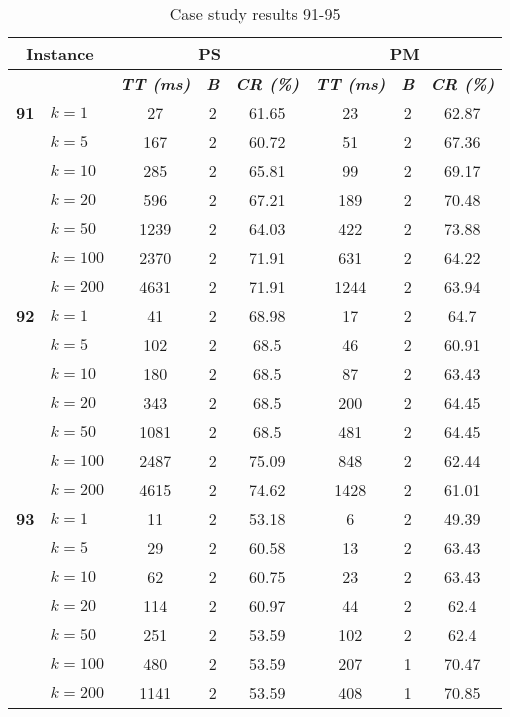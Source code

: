     \begin{table}[htbp]
    \caption{Case study results 91-95}
    \centering
    \begin{tabular}{|l|l|c|c|c|c|c|c|}
    \hline
    \multicolumn{ 2}{|c|}{\textbf{Instance}} & \multicolumn{ 3}{c|}{\textbf{PS}} & \multicolumn{ 3}{c|}{\textbf{PM}} \\ \hline
    \multicolumn{ 2}{|l|}{} & \textbf{\textit{TT (ms)}} & \textbf{\textit{B}} & \textbf{\textit{CR (\%)}} & \textbf{\textit{TT (ms)}} & \textbf{\textit{B}} & \textbf{\textit{CR (\%)}} \\ \hline
    \multicolumn{1}{|r|}{\textbf{91}} & $k=1$ & 27 & 2 & 61.65 & 23 & 2 & 62.87 \\ 
     & $k=5$ & 167 & 2 & 60.72 & 51 & 2 & 67.36 \\ 
     & $k=10$ & 285 & 2 & 65.81 & 99 & 2 & 69.17 \\ 
     & $k=20$ & 596 & 2 & 67.21 & 189 & 2 & 70.48 \\ 
     & $k=50$ & 1239 & 2 & 64.03 & 422 & 2 & 73.88 \\ 
     & $k=100$ & 2370 & 2 & 71.91 & 631 & 2 & 64.22 \\ 
     & $k=200$ & 4631 & 2 & 71.91 & 1244 & 2 & 63.94 \\ \hline
    \multicolumn{1}{|r|}{\textbf{92}} & $k=1$ & 41 & 2 & 68.98 & 17 & 2 & 64.7 \\ 
     & $k=5$ & 102 & 2 & 68.5 & 46 & 2 & 60.91 \\ 
     & $k=10$ & 180 & 2 & 68.5 & 87 & 2 & 63.43 \\ 
     & $k=20$ & 343 & 2 & 68.5 & 200 & 2 & 64.45 \\ 
     & $k=50$ & 1081 & 2 & 68.5 & 481 & 2 & 64.45 \\ 
     & $k=100$ & 2487 & 2 & 75.09 & 848 & 2 & 62.44 \\ 
     & $k=200$ & 4615 & 2 & 74.62 & 1428 & 2 & 61.01 \\ \hline
    \multicolumn{1}{|r|}{\textbf{93}} & $k=1$ & 11 & 2 & 53.18 & 6 & 2 & 49.39 \\ 
     & $k=5$ & 29 & 2 & 60.58 & 13 & 2 & 63.43 \\ 
     & $k=10$ & 62 & 2 & 60.75 & 23 & 2 & 63.43 \\ 
     & $k=20$ & 114 & 2 & 60.97 & 44 & 2 & 62.4 \\ 
     & $k=50$ & 251 & 2 & 53.59 & 102 & 2 & 62.4 \\ 
     & $k=100$ & 480 & 2 & 53.59 & 207 & 1 & 70.47 \\ 
     & $k=200$ & 1141 & 2 & 53.59 & 408 & 1 & 70.85 \\ \hline

\end{tabular}
\end{table}
